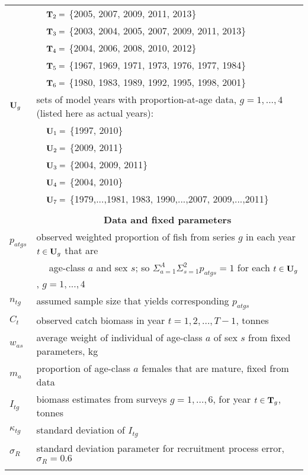 \documentclass[11pt]{article}   %
\def\gcomm{7}                    %
\def\newp{\vfill \break}
\begin{document}
\begin{tabular}{ll}
 & ~~${\bf T}_2 =$ \{2005, 2007, 2009, 2011, 2013\}\\
 & ~~${\bf T}_3 =$ \{2003, 2004, 2005, 2007, 2009, 2011, 2013\}\\
 & ~~${\bf T}_4 =$ \{2004, 2006, 2008, 2010, 2012\}\\
 & ~~${\bf T}_5 =$ \{1967, 1969, 1971, 1973, 1976, 1977, 1984\}\\
 & ~~${\bf T}_6 =$ \{1980, 1983, 1989, 1992, 1995, 1998, 2001\}\\
${\bf U}_g$ & sets of model years with proportion-at-age data, $g=1,...,4$ (listed here as actual years):\\
 & ~~${\bf U}_1 =$ \{1997, 2010\}\\
 & ~~${\bf U}_2 =$ \{2009, 2011\}\\
 & ~~${\bf U}_3 =$ \{2004, 2009, 2011\}\\
 & ~~${\bf U}_4 =$ \{2004, 2010\}\\
 & ~~${\bf U}_\gcomm =$ \{1979,...,1981, 1983, 1990,...,2007, 2009,...,2011\}\\
\\[-.5ex]

& \multicolumn{1}{c}{{\bf Data and fixed parameters}} \\[0.5ex]
$p_{atgs}$ & observed weighted proportion of fish from series $g$ in each year $t \in {\bf U}_g$ that are\\
 & ~~  age-class $a$ and sex $s$; so $\Sigma_{a=1}^{A} \Sigma_{s=1}^2 p_{atgs} = 1$ for each $t  \in {\bf U}_g$, $g=1,...,4$\\
$n_{tg}$ & assumed sample size that yields corresponding $p_{atgs}$\\
$C_t$ & observed catch biomass in year $t = 1, 2, ..., T-1$, tonnes\\
$w_{as}$ & average weight of individual of age-class $a$ of sex $s$ from fixed parameters, kg\\ 
$m_a$ & proportion of age-class $a$ females that are mature, fixed from data\\
$I_{tg}$ & biomass estimates from surveys $g = 1,...,6$, for year $t \in {\bf T}_g$, tonnes\\
$\kappa_{tg}$ & standard deviation of $I_{tg}$\\
$\sigma_R$ & standard deviation parameter for recruitment process error, $\sigma_R = 0.6$ \\
\\[-.5ex]
%
%
\end{tabular} \newp %
\end{document}
